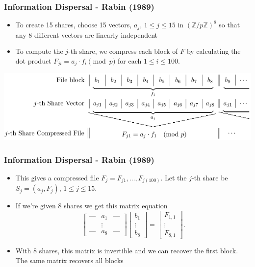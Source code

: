 \documentclass{beamer}
\newcommand{\integers}{\mathbb{Z}}
\begin{document}
\begin{frame}
	\frametitle{Information Dispersal - Rabin (1989)}
	\begin{itemize}
		\item To create 15 shares, choose 15 vectors, $a_j$, $1\leq j\leq 15$ in $(\integers/p\integers)^8$ so that any 8 different vectors are linearly independent\pause

		\item To compute the $j$-th share, we compress each block of $F$ by calculating the dot product $F_{ji} = a_j\cdot f_i\pmod{p}$ for each $1\leq i\leq 100$.\pause
	\end{itemize}
	\vspace{.5cm}
	\centering
	\includegraphics[scale=.6]{rabin_compression.png}
\end{frame}

\begin{frame}
	\frametitle{Information Dispersal - Rabin (1989)}
	\begin{itemize}
		\item This gives a compressed file $F_j = F_{j1}, \ldots, F_{j(100)}$. Let the $j$-th share be $S_j = (a_j, F_j)$, $1\leq j\leq 15$.\pause
		\item If we're given 8 shares we get this matrix equation
		\[
		\begin{bmatrix}
			\text{---} & a_1 & \text{---}\\
			&\vdots&\\
			\text{---} & a_8 & \text{---}
		\end{bmatrix}
		\begin{bmatrix}
			b_1\\
			\vdots\\
			b_8
		\end{bmatrix}=
		\begin{bmatrix}
			F_{1,1}\\
			\vdots\\
			F_{8,1}
		\end{bmatrix}.
		\]\pause
		\item With 8 shares, this matrix is invertible and we can recover the first block. The same matrix recovers all blocks
	\end{itemize}
\end{frame}
\end{document}
